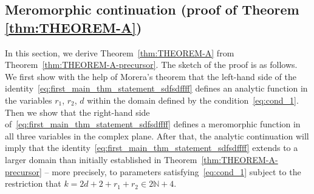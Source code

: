 \documentclass[]{article}
\begin{document}
\subsection{Meromorphic continuation (proof of Theorem \ref{thm:THEOREM-A})}\label{sec:mero}

In this section, we derive Theorem~\ref{thm:THEOREM-A} from Theorem~\ref{thm:THEOREM-A-precursor}. 
The sketch of the proof is as follows. 
We first show with the help of Morera's theorem that the left-hand side of the identity~\eqref{eq:first_main_thm_statement_sdfsdffff}   defines an analytic function in the variables $r_1$, $r_2$, $d$ within the domain defined by the  condition~\eqref{eq:cond_1}. Then we show that the  right-hand side of~\eqref{eq:first_main_thm_statement_sdfsdffff} defines a meromorphic function in all three variables in the complex plane. %
After that, the analytic continuation will imply that the identity~\eqref{eq:first_main_thm_statement_sdfsdffff} extends to a larger domain than initially established in Theorem~\ref{thm:THEOREM-A-precursor} -- more precisely, to parameters satisfying~\eqref{eq:cond_1} subject to the restriction that $k = 2d+2+r_1+r_2 \in 2 \mathbb{N} + 4$. 
\end{document}
